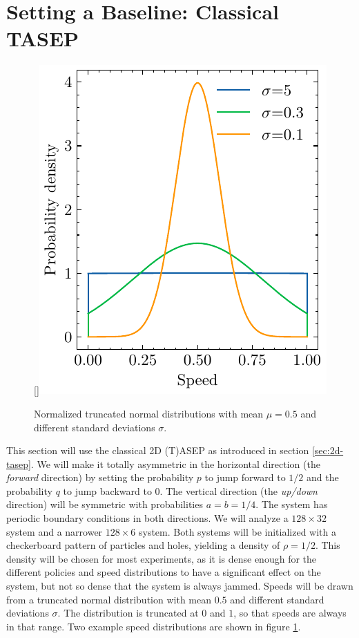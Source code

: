 \newpage

\section{Setting a Baseline: Classical TASEP}
\label{sec:baseline}
\begin{figure}
    \raisebox{0pt}[\dimexpr{}\baselineskip\relax]{\includegraphics{truncated_normal.pdf}}
    \caption{Normalized truncated normal distributions with mean $\mu=0.5$ and different standard deviations $\sigma$.}
    \label{fig:speed_dists}
\end{figure}
This section will use the classical 2D (T)ASEP as introduced in section \ref{sec:2d-tasep}. We will make it totally asymmetric in the horizontal direction (the \textit{forward} direction) by setting the probability $p$ to jump forward to $1/2$ and the probability $q$ to jump backward to $0$. The vertical direction (the \textit{up/down} direction) will be symmetric with probabilities $a=b=1/4$. The system has periodic boundary conditions in both directions. We will analyze a $128 \times 32$ system and a narrower $128 \times 6$ system. Both systems will be initialized with a checkerboard pattern of particles and holes, yielding a density of $\rho = 1/2$. This density will be chosen for most experiments, as it is dense enough for the different policies and speed distributions to have a significant effect on the system, but not so dense that the system is always jammed. Speeds will be drawn from a truncated normal distribution with mean $0.5$ and different standard deviations $\sigma$. The distribution is truncated at $0$ and $1$, so that speeds are always in that range. Two example speed distributions are shown in figure \ref{fig:speed_dists}. 

